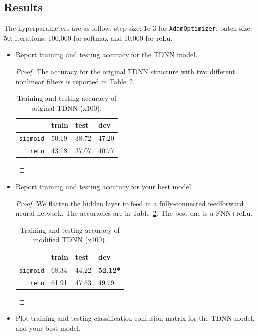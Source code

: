\documentclass[11pt]{article}
\newcommand{\1}{\mathbf{1}}
\begin{document}
{\subsection{Results}
The hyperparameters are as follow: step size: 1e-3 for {\tt AdamOptimizer}; batch size: 50; iterations: 100,000 for softmax and 10,000 for reLu.

\begin{itemize}
  \item Report training and testing accuracy for the TDNN model.
      \begin{proof}
        The accuracy for the original TDNN structure with two different nonlinear filters is reported in Table~\ref{tf:acc1}.
        \begin{table}[htbp]
        \centering
          \begin{tabular}{r|l|l|l}
          \hline
            & train & test & dev\\
            \hline
            {\tt sigmoid} & 50.19 & 38.72 & 47.20 \\
            \hline
            {\tt reLu} & 43.18 & 37.07 & 40.77\\
            \hline
          \end{tabular}
          \caption{Training and testing accuracy of original TDNN (x100).\label{tf:acc1}}
        \end{table}
      \end{proof}
  \item Report training and testing accuracy for your best model.
      \begin{proof}
        We flatten the hidden layer to feed in a fully-connected feedforward neural network. The accuracies are in Table~\ref{tf:acc1}. The best one is a FNN+reLu.
        \begin{table}[htbp]
        \centering
          \begin{tabular}{r|l|l|l}
          \hline
            & train & test & dev \\
            \hline
            {\tt sigmoid} & 68.34 & 44.22 & \bf 52.12*\\
            \hline
            {\tt reLu} & 61.91 & 47.63 & 49.79\\
            \hline
          \end{tabular}
          \caption{Training and testing accuracy of modified TDNN (x100).\label{tf:acc1}}
        \end{table}
      \end{proof}
  \item Plot training and testing classification confusion matrix for the TDNN model, and your best model.

\end{itemize}}
\end{document}
